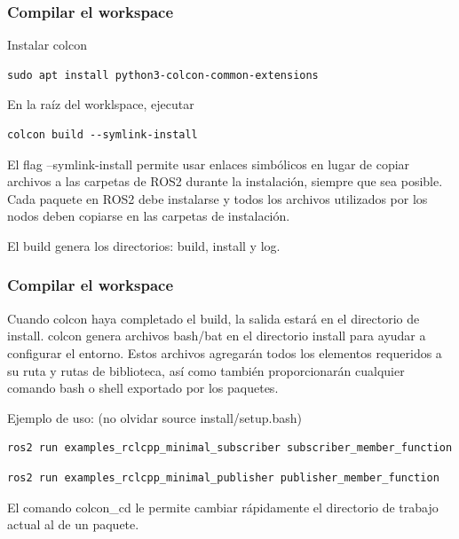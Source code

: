 \begin{frame}[fragile]
	\frametitle{Compilar el workspace}

Instalar colcon
\begin{lstlisting}[style=bash] 
sudo apt install python3-colcon-common-extensions
\end{lstlisting}

En la raíz del worklspace, ejecutar
\begin{lstlisting}[style=bash] 
colcon build --symlink-install
\end{lstlisting}

	El flag --symlink-install permite usar enlaces simbólicos en lugar de copiar archivos a las carpetas de ROS2 durante la instalación, siempre que sea posible. Cada paquete en ROS2 debe instalarse y todos los archivos utilizados por los nodos deben copiarse en las carpetas de instalación.
	
	El build genera los directorios: build, install y log.
\end{frame}

\begin{frame}[fragile]
	\frametitle{Compilar el workspace}
	
	Cuando colcon haya completado el build, la salida estará en el directorio de install.  colcon genera archivos bash/bat en el directorio install para ayudar a configurar el entorno. Estos archivos agregarán todos los elementos requeridos a su ruta y rutas de biblioteca, así como también proporcionarán cualquier comando bash o shell exportado por los paquetes.

Ejemplo de uso: (no olvidar source install/setup.bash)
\begin{lstlisting}[style=bash] 
ros2 run examples_rclcpp_minimal_subscriber subscriber_member_function
\end{lstlisting}

\begin{lstlisting}[style=bash] 
ros2 run examples_rclcpp_minimal_publisher publisher_member_function
\end{lstlisting}
El comando colcon\_cd le permite cambiar rápidamente el directorio de trabajo actual al de un paquete.

\end{frame}

